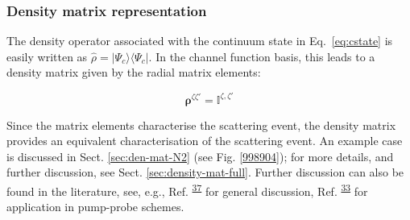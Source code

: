 \documentclass[10pt]{article}
\begin{document}
\subsubsection{Density matrix representation\label{sec:density-mat-basic}}
The density operator associated with the continuum state in Eq.~\ref{eq:cstate} is easily written as $\hat{\rho}=|\Psi_c\rangle\langle\Psi_c|$. In the channel function basis, this leads to a density matrix given by the radial matrix elements:

\begin{equation}
\mathbf{\rho}^{\zeta\zeta'} = \mathbb{I}^{\zeta,\zeta'}
\label{eqn:radial-density-mat}
\end{equation}

Since the matrix elements characterise the scattering event, the density matrix provides an equivalent characterisation of the scattering event.
An example case is discussed in Sect. \ref{sec:den-mat-N2} (see Fig. \ref{998904}); for more details, and further discussion, see Sect. \ref{sec:density-mat-full}. Further discussion can also be found in the literature, see, e.g., Ref. \textsuperscript{\hyperref[csl:37]{37}} for general discussion, Ref. \textsuperscript{\hyperref[csl:33]{33}} for application in pump-probe schemes.


\end{document}
